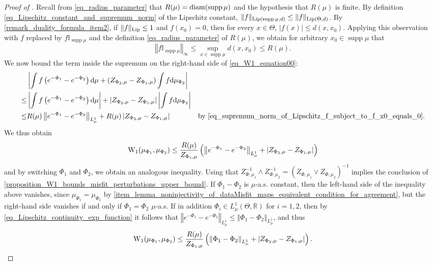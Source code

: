 \documentclass[a4paper]{scrartcl}
\theoremstyle{definition}
\numberwithin{equation}{section}
\newcommand{\R}{\mathbb{R}}
\newcommand{\rd}{\mathrm{d}}
\newcommand{\diam}[1]{\textup{diam}({#1})}
\DeclareMathOperator{\supp}{supp}
\newcommand{\abs}[1]{\vert #1\vert}
\newcommand{\Abs}[1]{\left\vert#1\right\vert}
\newcommand{\norm}[1]{\Vert #1 \Vert}
\newcommand{\Norm}[1]{\left\Vert #1 \right\Vert}
\newcommand{\Lip}[0]{\textup{Lip}}
\newcommand{\Was}[0]{\textup{W}}
\begin{document}
\begin{proof}[Proof of ]
  Recall from \eqref{eq_radius_parameter} that $R(\mu)=\diam{\supp{\mu}}$ and the hypothesis that $R(\mu)$ is finite.
  By definition \eqref{eq_Lipschitz_constant_and_supremum_norm} of the Lipschitz constant, $\norm{f}_{\Lip(\supp{\mu},d)}\leq \norm{f}_{\Lip(\Theta,d)}$.
 By \ref{remark_duality_formula_item2}, if $\norm{f}_{\Lip}\leq 1$ and $f(x_0)=0$, then for every $x\in\Theta$, $\abs{f(x)}\leq d(x,x_0)$. 
 Applying this observation with $f$ replaced by $f\mathbb{I}_{\supp{\mu}}$ and the definition \eqref{eq_radius_parameter} of $R(\mu)$, we obtain for arbitrary $x_0\in\supp{\mu}$ that
 \begin{equation}
 \label{eq_supremum_norm_of_Lipschitz_f_subject_to_f_x0_equals_0}
  \Norm{f\mathbb{I}_{\supp{\mu}}}_\infty\leq \sup_{x\in\supp{\mu}} d(x,x_0)\leq R(\mu).
 \end{equation}
 We now bound the term inside the supremum on the right-hand side of \eqref{eq_W1_equation00}:
 \begin{align*}
 &\Abs{\int f\left(  e^{-\Phi_1}-e^{-\Phi_2}\right)\rd \mu+(Z_{\Phi_2,\mu}-Z_{\Phi_1,\mu})\int f \rd \mu_{\Phi_2}}
 \\
 \leq &\Abs{\int f\left(  e^{-\Phi_1}-e^{-\Phi_2}\right)\rd \mu}+\abs{Z_{\Phi_2,\mu}-Z_{\Phi_1,\mu}}\Abs{\int f \rd \mu_{\Phi_2}}
 \\
 \leq & R(\mu)\Norm{ e^{-\Phi_1}-e^{-\Phi_2}}_{L^1_\mu} +R(\mu)\Abs{Z_{\Phi_2,\mu}-Z_{\Phi_1,\mu}}  & \text{by \eqref{eq_supremum_norm_of_Lipschitz_f_subject_to_f_x0_equals_0}.}
 \end{align*}
  We thus obtain
 \begin{equation*}
  \Was_1(\mu_{\Phi_1},\mu_{\Phi_2})\leq \frac{R(\mu)}{Z_{\Phi_1,\mu}}\left(\Norm{ e^{-\Phi_1}-e^{-\Phi_2}}_{L^1_\mu} +\Abs{Z_{\Phi_2,\mu}-Z_{\Phi_1,\mu}}\right)
 \end{equation*}
 and by switching $\Phi_1$ and $\Phi_2$, we obtain an analogous inequality. 
 Using that $Z_{\Phi,\mu_1}^{-1}\wedge Z_{\Phi,\mu_2}^{-1}=(Z_{\Phi,\mu_1}\vee Z_{\Phi,\mu_2})^{-1}$ implies the conclusion of \cref{proposition_W1_bounds_misfit_perturbations_upper_bound}. 
 If $\Phi_1-\Phi_2$ is $\mu$-a.s. constant, then the left-hand side of the inequality above vanishes, since $\mu_{\Phi_1}=\mu_{\Phi_2}$ by \ref{item_lemma_noninjectivity_of_dataMisfit_maps_equivalent_condition_for_agreement}, but the right-hand side vanishes  if and only if $\Phi_1=\Phi_2$ $\mu$-a.s. 
 If in addition $\Phi_i\in L^1_\mu(\Theta,\R)$ for $i=1,2$, then by \eqref{eq_Lipschitz_continuity_exp_function} it follows that $  \Norm{ e^{-\Phi_1}-e^{-\Phi_2}}_{L^1_\mu}\leq \Norm{\Phi_1-\Phi_2}_{L^1_\mu}$, and thus
 \begin{equation*}
  \Was_1(\mu_{\Phi_1},\mu_{\Phi_2})\leq \frac{R(\mu)}{Z_{\Phi_1,\mu}}\left(\Norm{\Phi_1-\Phi_2}_{L^1_\mu} +\Abs{Z_{\Phi_2,\mu}-Z_{\Phi_1,\mu}}\right).
 \end{equation*}
 

\end{proof}
\end{document}
